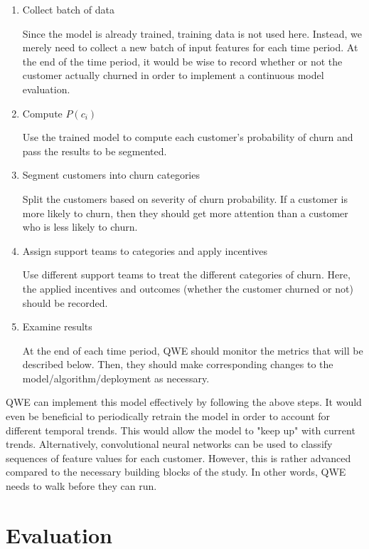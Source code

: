 \documentclass{article}
\begin{document}
	\begin{enumerate}
		\item Collect batch of data
		
		Since the model is already trained, training data is not used here. Instead, we merely need to collect a new batch of input features for each time period. At the end of the time period, it would be wise to record whether or not the customer actually churned in order to implement a continuous model evaluation.
		
		\item Compute $P(c_i)$
		
		Use the trained model to compute each customer's probability of churn and pass the results to be segmented.
		
		\item Segment customers into churn categories
		
		Split the customers based on severity of churn probability. If a customer is more likely to churn, then they should get more attention than a customer who is less likely to churn.
		
		\item Assign support teams to categories and apply incentives
		
		Use different support teams to treat the different categories of churn. Here, the applied incentives and outcomes (whether the customer churned or not) should be recorded. 
		
		\item Examine results
		
		At the end of each time period, QWE should monitor the metrics that will be described below. Then, they should make corresponding changes to the model/algorithm/deployment as necessary.
	\end{enumerate}

	QWE can implement this model effectively by following the above steps. It would even be beneficial to periodically retrain the model in order to account for different temporal trends. This would allow the model to "keep up" with current trends. Alternatively, convolutional neural networks can be used to classify sequences of feature values for each customer. However, this is rather advanced compared to the necessary building blocks of the study. In other words, QWE needs to walk before they can run.
	
	\section{Evaluation}
	
\end{document}
